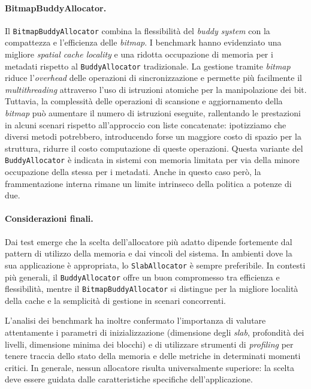\paragraph{BitmapBuddyAllocator.}
Il \texttt{BitmapBuddyAllocator} combina la flessibilità del \textit{buddy system} con la compattezza e l’efficienza delle \textit{bitmap}. I benchmark hanno evidenziato una migliore \textit{spatial cache locality} e una ridotta occupazione di memoria per i metadati rispetto al \texttt{BuddyAllocator} tradizionale. La gestione tramite \textit{bitmap} riduce l’\textit{overhead} delle operazioni di sincronizzazione e permette più facilmente il \textit{multithreading} attraverso l'uso di istruzioni atomiche per la manipolazione dei bit. Tuttavia, la complessità delle operazioni di scansione e aggiornamento della \textit{bitmap} può aumentare il numero di istruzioni eseguite, rallentando le prestazioni in alcuni scenari rispetto all’approccio con liste concatenate: ipotizziamo che diversi metodi potrebbero, introducendo forse un maggiore costo di spazio per la struttura, ridurre il costo computazione di queste operazioni.
Questa variante del \texttt{BuddyAllocator} è indicata in sistemi con memoria limitata per via della minore occupazione della stessa per i metadati. Anche in questo caso però, la frammentazione interna rimane un limite intrinseco della politica a potenze di due.

\paragraph{Considerazioni finali.}
Dai test emerge che la scelta dell’allocatore più adatto dipende fortemente dal pattern di utilizzo della memoria e dai vincoli del sistema. In ambienti dove la sua applicazione è appropriata, lo \texttt{SlabAllocator} è sempre preferibile. In contesti più generali, il \texttt{BuddyAllocator} offre un buon compromesso tra efficienza e flessibilità, mentre il \texttt{BitmapBuddyAllocator} si distingue per la migliore località della cache e la semplicità di gestione in scenari concorrenti.

L’analisi dei benchmark ha inoltre confermato l’importanza di valutare attentamente i parametri di inizializzazione (dimensione degli \textit{slab}, profondità dei livelli, dimensione minima dei blocchi) e di utilizzare strumenti di \textit{profiling} per tenere traccia dello stato della memoria e delle metriche in determinati momenti critici. In generale, nessun allocatore risulta universalmente superiore: la scelta deve essere guidata dalle caratteristiche specifiche dell’applicazione.


